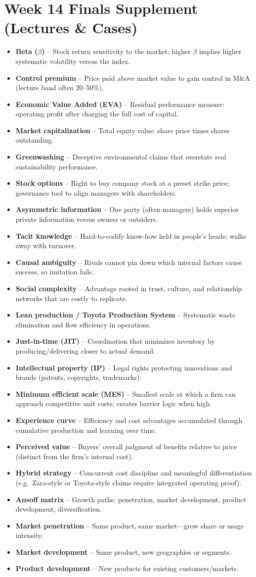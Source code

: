 \documentclass[10pt,a4paper]{article}
\newcommand{\vocab}[2]{\item \textbf{\textcolor{pinkmain}{#1}} -- #2}
\begin{document}
\section*{Week 14 Finals Supplement (Lectures \& Cases)}
\begin{itemize}
\vocab{Beta ($\beta$)}{Stock return sensitivity to the market; higher $\beta$ implies higher systematic volatility versus the index.}
\vocab{Control premium}{Price paid above market value to gain control in M\&A (lecture band often 20--50\%).}
\vocab{Economic Value Added (EVA)}{Residual performance measure: operating profit after charging the full cost of capital.}
\vocab{Market capitalization}{Total equity value: share price times shares outstanding.}
\vocab{Greenwashing}{Deceptive environmental claims that overstate real sustainability performance.}
\vocab{Stock options}{Right to buy company stock at a preset strike price; governance tool to align managers with shareholders.}
\vocab{Asymmetric information}{One party (often managers) holds superior private information versus owners or outsiders.}
\vocab{Tacit knowledge}{Hard-to-codify know-how held in people's heads; walks away with turnover.}
\vocab{Causal ambiguity}{Rivals cannot pin down which internal factors cause success, so imitation fails.}
\vocab{Social complexity}{Advantage rooted in trust, culture, and relationship networks that are costly to replicate.}
\vocab{Lean production / Toyota Production System}{Systematic waste elimination and flow efficiency in operations.}
\vocab{Just-in-time (JIT)}{Coordination that minimizes inventory by producing/delivering closer to actual demand.}
\vocab{Intellectual property (IP)}{Legal rights protecting innovations and brands (patents, copyrights, trademarks).}
\vocab{Minimum efficient scale (MES)}{Smallest scale at which a firm can approach competitive unit costs; creates barrier logic when high.}
\vocab{Experience curve}{Efficiency and cost advantages accumulated through cumulative production and learning over time.}
\vocab{Perceived value}{Buyers' overall judgment of benefits relative to price (distinct from the firm's internal cost).}
\vocab{Hybrid strategy}{Concurrent cost discipline and meaningful differentiation (e.g.\ Zara-style or Toyota-style claims require integrated operating proof).}
\vocab{Ansoff matrix}{Growth paths: penetration, market development, product development, diversification.}
\vocab{Market penetration}{Same product, same market---grow share or usage intensity.}
\vocab{Market development}{Same product, new geographies or segments.}
\vocab{Product development}{New products for existing customers/markets.}

\end{itemize}
\end{document}
